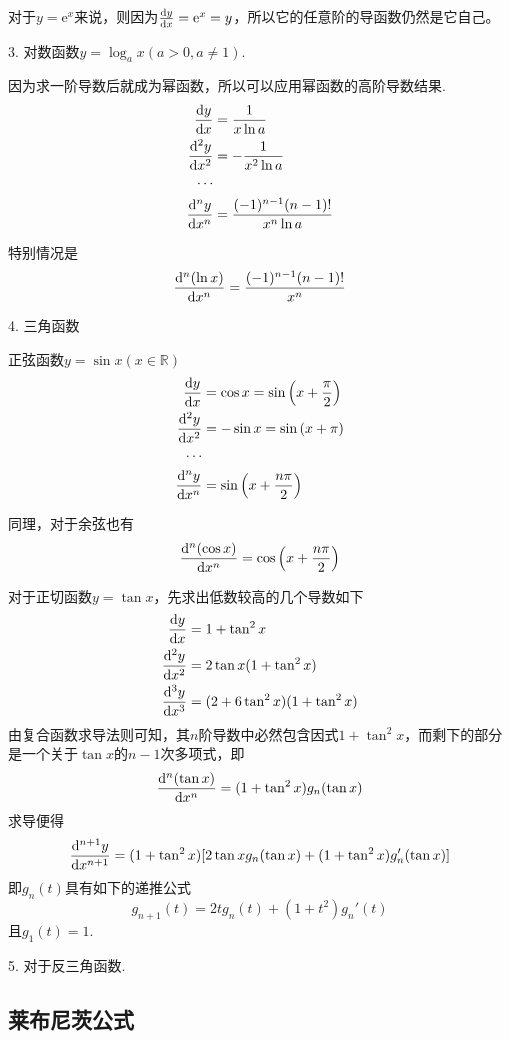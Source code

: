 对于$y=\mathrm{e}^x$来说，则因为$\frac{\mathop{}\!\mathrm{d} y}{\mathop{}\!\mathrm{d} x} = \mathrm{e}^x = y$，所以它的任意阶的导函数仍然是它自己。

3. 对数函数$y=\log_a x(a>0, a \neq 1)$.

因为求一阶导数后就成为幂函数，所以可以应用幂函数的高阶导数结果.
\begin{align*}
  \frac{\mathop{}\!\mathrm{d} y}{\mathop{}\!\mathrm{d} x} & = \frac{1}{x \ln{a}} \\
  \frac{\mathop{}\!\mathrm{d} ^2y}{\mathop{}\!\mathrm{d} x^2} & = - \frac{1}{x^2\ln{a}} \\
  \cdots \\
  \frac{\mathop{}\!\mathrm{d}^ny}{\mathop{}\!\mathrm{d} x^n} & = \frac{(-1)^{n-1}(n-1)!}{x^n \ln{a}}
\end{align*}

特别情况是
\[ \frac{\mathop{}\!\mathrm{d}^n (\ln{x})}{\mathop{}\!\mathrm{d} x^n} = \frac{(-1)^{n-1}(n-1)!}{x^n} \]

4. 三角函数

正弦函数$y=\sin{x}(x \in \mathbb{R})$
\begin{align*}
  \frac{\mathop{}\!\mathrm{d} y}{\mathop{}\!\mathrm{d} x} & = \cos{x} = \sin{\left( x+\frac{\pi}{2} \right)} \\
  \frac{\mathop{}\!\mathrm{d}^2 y}{\mathop{}\!\mathrm{d} x^2} & = -\sin{x} = \sin{(x+\pi)} \\
  \cdots \\
  \frac{\mathop{}\!\mathrm{d}^ny}{\mathop{}\!\mathrm{d} x^n} & = \sin{\left( x+\frac{n\pi}{2} \right)}
\end{align*}

同理，对于余弦也有
\[ \frac{\mathop{}\!\mathrm{d}^n (\cos{x})}{\mathop{}\!\mathrm{d} x^n} = \cos{\left( x+\frac{n\pi}{2} \right)} \]

对于正切函数$y=\tan{x}$，先求出低数较高的几个导数如下
\begin{align*}
  \frac{\mathop{}\!\mathrm{d} y}{\mathop{}\!\mathrm{d} x} & = 1+\tan^2{x} \\
  \frac{\mathop{}\!\mathrm{d}^2 y}{\mathop{}\!\mathrm{d} x^2} & = 2\tan{x}(1+\tan^2{x}) \\
  \frac{\mathop{}\!\mathrm{d}^3y}{\mathop{}\!\mathrm{d} x^3} & = (2+6\tan^2{x})(1+\tan^2{x})
\end{align*}
由复合函数求导法则可知，其$n$阶导数中必然包含因式$1+\tan^2{x}$，而剩下的部分是一个关于$\tan{x}$的$n-1$次多项式，即
\[ \frac{\mathop{}\!\mathrm{d}^n (\tan{x})}{\mathop{}\!\mathrm{d} x^n} = (1+\tan^2{x})g_n(\tan{x}) \]
求导便得
\[ \frac{\mathop{}\!\mathrm{d}^{n+1}y}{\mathop{}\!\mathrm{d} x^{n+1}} = (1+\tan^2{x})[2\tan{x}g_n(\tan{x})+(1+\tan^2{x})g_n'(\tan{x})] \]
即$g_n(t)$具有如下的递推公式
\[ g_{n+1}(t) = 2tg_n(t)+(1+t^2)g_n'(t) \]
且$g_1(t)=1$.

5. 对于反三角函数.

\subsection{莱布尼茨公式}
\label{sec:Leibniz-formular-for-high-level-derivative-of-multiply}

